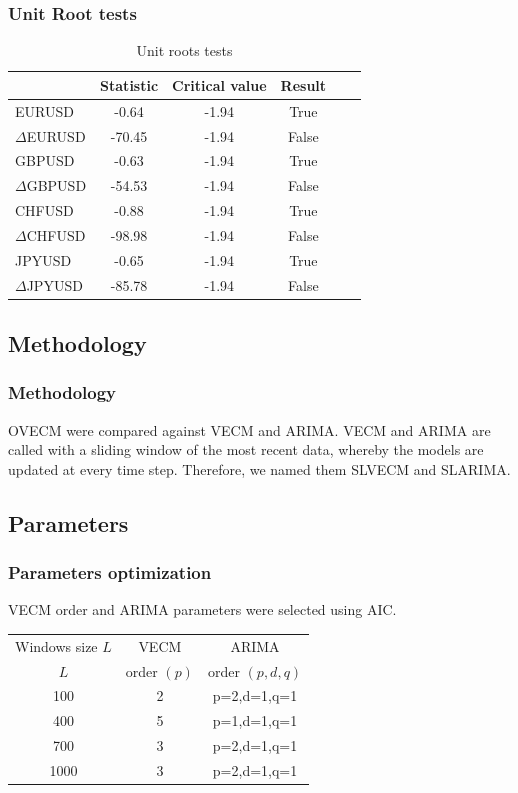 \documentclass[xcolor=dvipsnames]{beamer}
\begin{document}
\begin{frame}
\frametitle{Unit Root tests}
\begin{table}[h!]
\caption{Unit roots tests}
\label{tab:adf}
\begin{center}
\begin{tabular}{|l|c|c|c|c|c|}
\hline
& \textbf{Statistic} & \textbf{Critical value} & \textbf{Result}\\
\hline
EURUSD          & -0.64 & -1.94 & True       \\
$\Delta$EURUSD & -70.45   & -1.94 & False       \\
GBPUSD          & -0.63   & -1.94 & True          \\
$\Delta$GBPUSD & -54.53   & -1.94 & False       \\
CHFUSD          & -0.88   & -1.94 & True         \\
$\Delta$CHFUSD & -98.98   & -1.94 & False       \\
JPYUSD          & -0.65 & -1.94 & True        \\
$\Delta$JPYUSD & -85.78 & -1.94 & False     \\ 
\hline
\end{tabular}
\end{center}
\end{table}
\end{frame}

\subsection{Methodology}
\begin{frame}
\frametitle{Methodology}
OVECM were compared against VECM and ARIMA. VECM and ARIMA are called with a
sliding window of the most recent data, whereby the models are updated at every
time step. Therefore, we named them SLVECM and SLARIMA.
\end{frame}

\subsection{Parameters}
\begin{frame}
\frametitle{Parameters optimization}
VECM order and ARIMA parameters were selected using AIC.

\begin{table}[ht]
\label{tab:params}
\begin{center}
\begin{tabular}{|c|c|c|}
\hline
Windows size $L$ & VECM & ARIMA\\
 $L$ & order $(p)$ & order $(p,d,q)$ \\
\hline
100 & 2 & p=2,d=1,q=1\\
400 & 5 & p=1,d=1,q=1\\
700 & 3 &p=2,d=1,q=1\\
1000 &3 & p=2,d=1,q=1\\
\hline
\end{tabular}
\end{center}
\end{table}
\end{frame}
\end{document}
